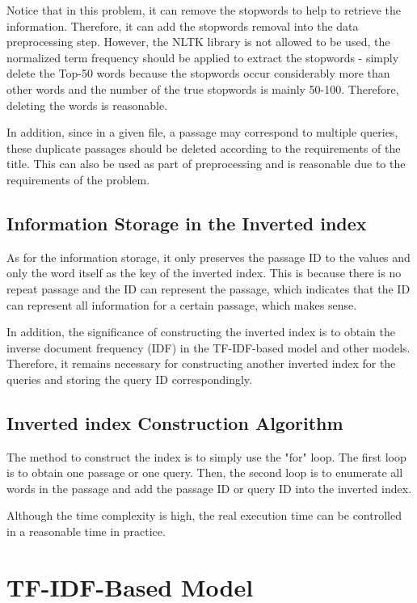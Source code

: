 \documentclass[11pt]{article}
\begin{document}
Notice that in this problem, it can remove the stopwords to help to retrieve the information. Therefore, it can add the stopwords removal into the data preprocessing step. However, the NLTK library is not allowed to be used, the normalized term frequency should be applied to extract the stopwords - simply delete the Top-50 words because the stopwords occur considerably more than other words and the number of the true stopwords is mainly 50-100. Therefore, deleting the words is reasonable.

In addition, since in a given file, a passage may correspond to multiple queries, these duplicate passages should be deleted according to the requirements of the title. This can also be used as part of preprocessing and is reasonable due to the requirements of the problem.

\subsection{Information Storage in the Inverted index}

As for the information storage, it only preserves the passage ID to the values and only the word itself as the key of the inverted index. This is because there is no repeat passage and the ID can represent the passage, which indicates that the ID can represent all information for a certain passage, which makes sense.

In addition, the significance of constructing the inverted index is to obtain the inverse document frequency (IDF) in the TF-IDF-based model and other models. Therefore, it remains necessary for constructing another inverted index for the queries and storing the query ID correspondingly.

\subsection{Inverted index Construction Algorithm}

The method to construct the index is to simply use the "for" loop. The first loop is to obtain one passage or one query. Then, the second loop is to enumerate all words in the passage and add the passage ID or query ID into the inverted index.

Although the time complexity is high, the real execution time can be controlled in a reasonable time in practice.

\section{TF-IDF-Based Model}
\end{document}

